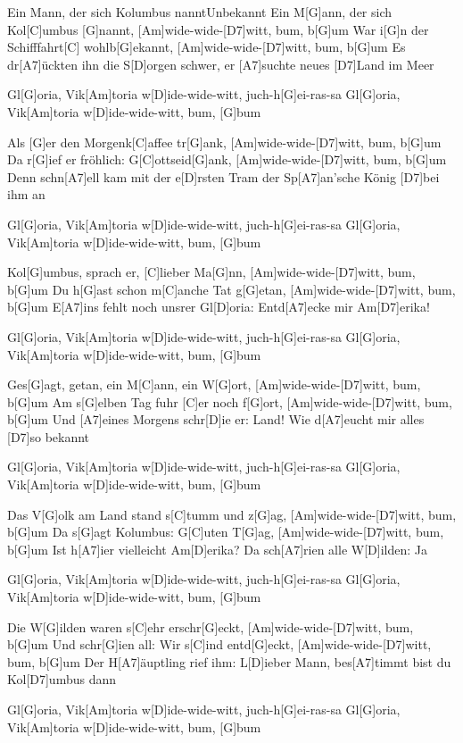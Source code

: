 \documentclass[../main.tex]{subfiles}
\begin{document}
\begin{song}{Ein Mann, der sich Kolumbus nannt}{Unbekannt}{}
Ein M[G]ann, der sich Kol[C]umbus [G]nannt, [Am]wide-wide-[D7]witt, bum, b[G]um
War i[G]n der Schifffahrt[C] wohlb[G]ekannt, [Am]wide-wide-[D7]witt, bum, b[G]um
Es dr[A7]{ü}ckten ihn die S[D]orgen schwer, er [A7]suchte neues [D7]Land im Meer

Gl[G]oria, Vik[Am]toria w[D]ide-wide-witt, juch-h[G]ei-ras-sa
Gl[G]oria, Vik[Am]toria w[D]ide-wide-witt, bum, [G]bum

Als [G]er den Morgenk[C]affee tr[G]ank, [Am]wide-wide-[D7]witt, bum, b[G]um
Da r[G]ief er fröhlich: G[C]ottseid[G]ank, [Am]wide-wide-[D7]witt, bum, b[G]um
Denn schn[A7]ell kam mit der e[D]rsten Tram der Sp[A7]an'sche König [D7]bei ihm an

Gl[G]oria, Vik[Am]toria w[D]ide-wide-witt, juch-h[G]ei-ras-sa
Gl[G]oria, Vik[Am]toria w[D]ide-wide-witt, bum, [G]bum

Kol[G]umbus, sprach er, [C]lieber Ma[G]nn, [Am]wide-wide-[D7]witt, bum, b[G]um
Du h[G]ast schon m[C]anche Tat g[G]etan, [Am]wide-wide-[D7]witt, bum, b[G]um
E[A7]ins fehlt noch unsrer Gl[D]oria: Entd[A7]ecke mir Am[D7]erika!

Gl[G]oria, Vik[Am]toria w[D]ide-wide-witt, juch-h[G]ei-ras-sa
Gl[G]oria, Vik[Am]toria w[D]ide-wide-witt, bum, [G]bum

Ges[G]agt, getan, ein M[C]ann, ein W[G]ort, [Am]wide-wide-[D7]witt, bum, b[G]um
Am s[G]elben Tag fuhr [C]er noch f[G]ort, [Am]wide-wide-[D7]witt, bum, b[G]um
Und [A7]eines Morgens schr[D]ie er: Land! Wie d[A7]eucht mir alles [D7]so bekannt

Gl[G]oria, Vik[Am]toria w[D]ide-wide-witt, juch-h[G]ei-ras-sa
Gl[G]oria, Vik[Am]toria w[D]ide-wide-witt, bum, [G]bum

Das V[G]olk am Land stand s[C]tumm und z[G]ag, [Am]wide-wide-[D7]witt, bum, b[G]um
Da s[G]agt Kolumbus: G[C]uten T[G]ag, [Am]wide-wide-[D7]witt, bum, b[G]um
Ist h[A7]ier vielleicht Am[D]erika? Da sch[A7]rien alle W[D]ilden: Ja

Gl[G]oria, Vik[Am]toria w[D]ide-wide-witt, juch-h[G]ei-ras-sa
Gl[G]oria, Vik[Am]toria w[D]ide-wide-witt, bum, [G]bum

Die W[G]ilden waren s[C]ehr erschr[G]eckt, [Am]wide-wide-[D7]witt, bum, b[G]um
Und schr[G]ien all: Wir s[C]ind entd[G]eckt, [Am]wide-wide-[D7]witt, bum, b[G]um
Der H[A7]{ä}uptling rief ihm: L[D]ieber Mann, bes[A7]timmt bist du Kol[D7]umbus dann

Gl[G]oria, Vik[Am]toria w[D]ide-wide-witt, juch-h[G]ei-ras-sa
Gl[G]oria, Vik[Am]toria w[D]ide-wide-witt, bum, [G]bum


\end{song}
\end{document}
